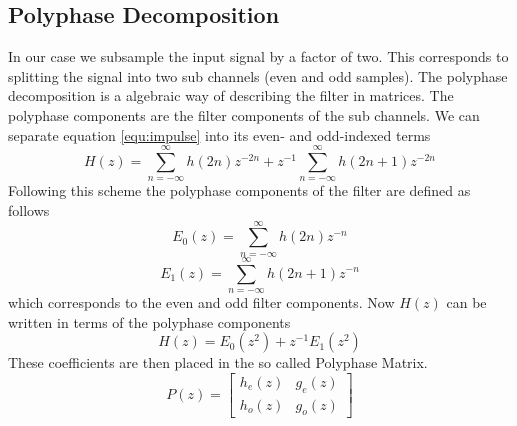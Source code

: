 \begin{refsection}

\subsection{Polyphase Decomposition \label{fpga:polyphase}}

In our case we subsample the input signal by a factor of two.
This corresponds to splitting the signal into two sub channels (even and odd samples).
The polyphase decomposition is a algebraic way of describing the filter in matrices.
The polyphase components are the filter components of the sub channels. 
We can separate equation \ref{equ:impulse} into its even- and odd-indexed terms
\begin{equation}
	H(z) = \sum_{n=-\infty}^{\infty} h(2n)z^{-2n} + z^{-1} \sum_{n=-\infty}^{\infty} h(2n+1)z^{-2n}
\end{equation}
Following this scheme the polyphase components of the filter are defined as follows
\begin{equation}
E_0(z) = \sum_{n=-\infty}^{\infty} h(2n)z^{-n}
\end{equation}
\begin{equation}
E_1(z) = \sum_{n=-\infty}^{\infty} h(2n+1)z^{-n}
\end{equation}
which corresponds to the even and odd filter components.
Now $H(z)$ can be written in terms of the polyphase components
\begin{equation}
H(z)=E_{0}(z^2)+z^{-1} E_1(z^2)
\end{equation}
These coefficients are then placed in the so called Polyphase Matrix.
\begin{equation}
	P(z) = 
	\begin{bmatrix}
	h_e(z) & g_e(z) \\
	h_o(z) & g_o(z)
	\end{bmatrix}
\end{equation}


\end{refsection}
